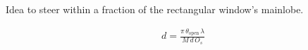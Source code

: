 \documentclass[10pt,journal,draftclsnofoot,onecolumn]{IEEEtran}
\newcommand\1{\vec 1}
\begin{document}
Idea to steer within a fraction of the rectangular window's mainlobe. 

\begin{align}
d = \frac{\pi\,\theta_\text{open}\,\lambda}{M\,d\,O_s}
\end{align}




% 
% 
% 
%   
% 

% 
% 

% 
% 
% 
% 
% 
% 
% 
% 
\end{document}

